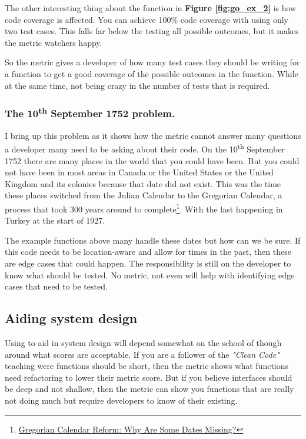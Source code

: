 The other interesting thing about the function in \textbf{Figure \ref{fig:go_ex_2}} is how code coverage is affected.
You can achieve 100\% code coverage with using only two test cases.
This falls far below the testing all possible outcomes, but it makes the metric watchers happy.

So the \cc metric gives a developer of how many test cases they should be writing for a function to get a good coverage of the possible outcomes in the function.
While at the same time, not being crazy in the number of tests that is required.

\subsubsection{The 10\textsuperscript{th} September 1752 problem.}
I bring up this problem as it shows how the \cc metric cannot answer many questions a developer many need to be asking about their code.
On the 10\textsuperscript{th} September 1752 there are many places in the world that you could have been.
But you could not have been in most areas in Canada or the United States or the United Kingdom and its colonies because that date did not exist.
This was the time these places switched from the Julian Calendar to the Gregorian Calendar, a process that took 300 years around to complete\footnote{\href{https://www.timeanddate.com/calendar/julian-gregorian-switch.html}{Gregorian Calendar Reform: Why Are Some Dates Missing?}}.
With the last happening in Turkey at the start of 1927.

The example functions above many handle these dates but how can we be sure.
If this code needs to be location-aware and allow for times in the past, then these are edge cases that could happen.
The responsibility is still on the developer to know what should be tested.
No metric, not even \cc will help with identifying edge cases that need to be tested.

\subsection{Aiding system design}
Using \cc to aid in system design will depend somewhat on the school of though around what scores are acceptable.
If you are a follower of the \textit{"Clean Code"} teaching were functions should be short, then the \cc metric shows what functions need refactoring to lower their metric score.
But if you believe interfaces should be deep and not shallow, then the metric can show you functions that are really not doing much but require developers to know of their existing.

